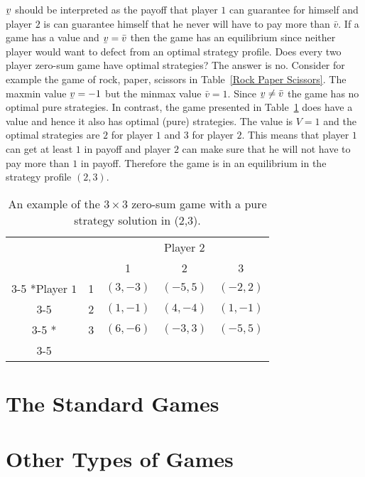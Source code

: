 \documentclass{article}
\theoremstyle{definition}
\theoremstyle{remark}
\newcommand{\ubar}[1]{\underaccent{\bar}{#1}}
\begin{document}
$\ubar{v}$ should be interpreted as the payoff that player $1$ can
guarantee for himself and player $2$ is can guarantee himself that he
never will have to pay more than $\bar{v}$. If a game has a value and
$\ubar{v} = \bar{v}$ then the game has an equilibrium since neither
player would want to defect from an optimal strategy profile. Does
every two player zero-sum game have optimal strategies? The answer is
no. Consider for example the game of rock, paper, scissors in
Table~\ref{Rock Paper Scissors}. The maxmin value $\ubar{v} = -1$ but
the minmax value $\bar{v} = 1$. Since $\ubar{v} \neq \bar{v}$ the game
has no optimal pure strategies. In contrast, the game presented in
Table~\ref{value game} does have a value and hence it also has optimal
(pure) strategies. The value is $V = 1$ and the optimal strategies are
$2$ for player $1$ and $3$ for player $2$. This means that player $1$
can get at least $1$ in payoff and player $2$ can make sure that he
will not have to pay more than $1$ in payoff. Therefore the game is in
an equilibrium in the strategy profile $(2,3)$.

\begin{table}[h!]
  \begin{center}
    \setlength{\extrarowheight}{2pt}
    \begin{tabular}{cc|c|c|c|}
      & \multicolumn{2}{c}{} & \multicolumn{1}{c}{Player $2$} & \multicolumn{1}{c}{}\\
      & \multicolumn{1}{c}{} & \multicolumn{1}{c}{1}  &
                                                          \multicolumn{1}{c}{2} & \multicolumn{1}{c}{3} \\\cline{3-5}
      \multirow{2}*{Player $1$}  & 1 & $(3,-3)$ & $(-5,5)$ & $(-2,2)$\\\cline{3-5}
      & 2 & $(1,-1)$ & $(4,-4)$ & $(1,-1)$\\\cline{3-5}
           \multirow{1}*{}  & 3 & $(6,-6)$ & $(-3,3)$ & $(-5,5)$\\\cline{3-5}   \end{tabular}
    \caption{An example of the $3\times 3$ zero-sum game with a pure
      strategy solution in (2,3).}
    \label{value game}
    \end{center}
  \end{table}

\section{The Standard Games}

\section{Other Types of Games}

\newpage
\printbibliography
\end{document}
